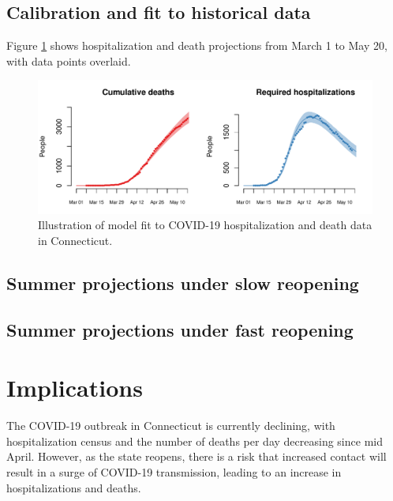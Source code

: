 \documentclass[11pt]{article}
\newcommand{\comment}[1]{[\textcolor{red}{#1}]}
\begin{document}
\subsection*{Calibration and fit to historical data}


Figure \ref{fig:calibration} shows hospitalization and death projections from March 1 to May 20, with data points overlaid.  



\begin{figure}
\centering
\includegraphics[width=.9\textwidth]{figures/calibration.pdf}
\caption{Illustration of model fit to COVID-19 hospitalization and death data in Connecticut. }
\label{fig:calibration}
\end{figure}


\subsection*{Summer projections under slow reopening} 




\subsection*{Summer projections under fast reopening} 






\section*{Implications}

The COVID-19 outbreak in Connecticut is currently declining, with hospitalization census and the number of deaths per day decreasing since mid April.  However, as the state reopens, there is a risk that increased contact will result in a surge of COVID-19 transmission, leading to an increase in hospitalizations and deaths.  
\end{document}
